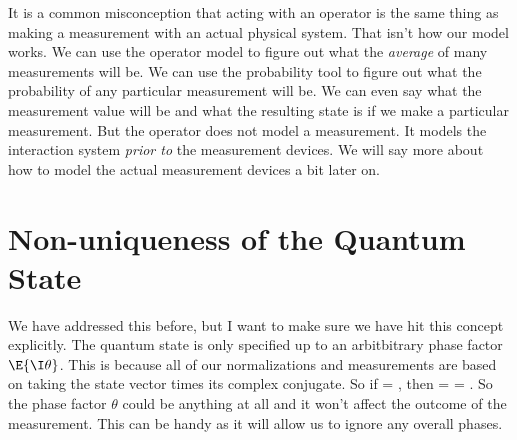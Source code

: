 \begin{marginfigure}
\end{marginfigure}
It is a common misconception that acting with an operator is the same thing as making a measurement with an actual physical system. That isn't how our model works. We can use the operator model to figure out what the {\em average} of many measurements will be. We can use the probability tool to figure out what the probability of any particular measurement will be. We can even say what the measurement value will be and what the resulting state is if we make a particular measurement. But the operator does not model a measurement. It models the interaction system {\em prior to} the measurement devices. We will say more about how to model the actual measurement devices a bit later on.


\section{Non-uniqueness of the Quantum State}
We have addressed this before, but I want to make sure we have hit this concept explicitly. The quantum state is only specified up to an arbitbitrary phase factor $\E{\I \theta}$. This is because all of our normalizations and measurements are based on taking the state vector times its complex conjugate. So if
\beq
\ket{\Psi} = \E{\I\theta},
\eeq
then 
\beq
\avg{\Psi|\Psi} = \E{-\I\theta}\E{\I\theta} = .
\eeq
So the phase factor $\theta$ could be anything at all and it won't affect the outcome of the measurement. This can be handy as it will allow us to ignore any overall phases.

